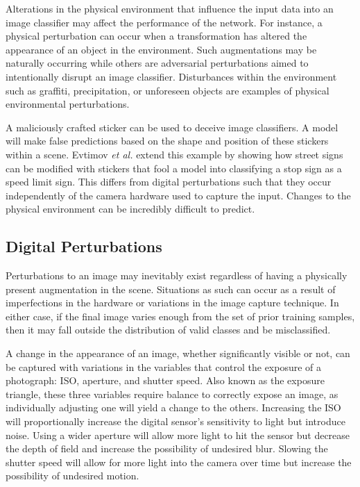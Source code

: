 \documentclass[conference]{IEEEtran}
\begin{document}
Alterations in the physical environment that influence the input data into an image classifier may affect the performance of the network. For instance, a physical perturbation can occur when a transformation has altered the appearance of an object in the environment. Such augmentations may be naturally occurring while others are adversarial perturbations aimed to intentionally disrupt an image classifier. Disturbances within the environment such as graffiti, precipitation, or unforeseen objects are examples of physical environmental perturbations. 

A maliciously crafted sticker \cite{adversarial-patch} can be used to deceive image classifiers. A model will make false predictions based on the shape and position of these stickers within a scene. Evtimov {\it et al.} \cite{robustphysical} extend this example by showing how street signs can be modified with stickers that fool a model into classifying a stop sign as a speed limit sign. This differs from digital perturbations such that they occur independently of the camera hardware used to capture the input. Changes to the physical environment can be incredibly difficult to predict.

\subsection{Digital Perturbations}

Perturbations to an image may inevitably exist regardless of having a physically present augmentation in the scene. Situations as such can occur as a result of imperfections in the hardware or variations in the image capture technique. In either case, if the final image varies enough from the set of prior training samples, then it may fall outside the distribution of valid classes and be misclassified.

A change in the appearance of an image, whether significantly visible or not, can be captured with variations in the variables that control the exposure of a photograph: ISO, aperture, and shutter speed. Also known as the exposure triangle, these three variables require balance to correctly expose an image, as individually adjusting one will yield a change to the others. Increasing the ISO will proportionally increase the digital sensor's sensitivity to light but introduce noise. Using a wider aperture will allow more light to hit the sensor but decrease the depth of field and increase the possibility of undesired blur. Slowing the shutter speed will allow for more light into the camera over time but increase the possibility of undesired motion. 
\end{document}
